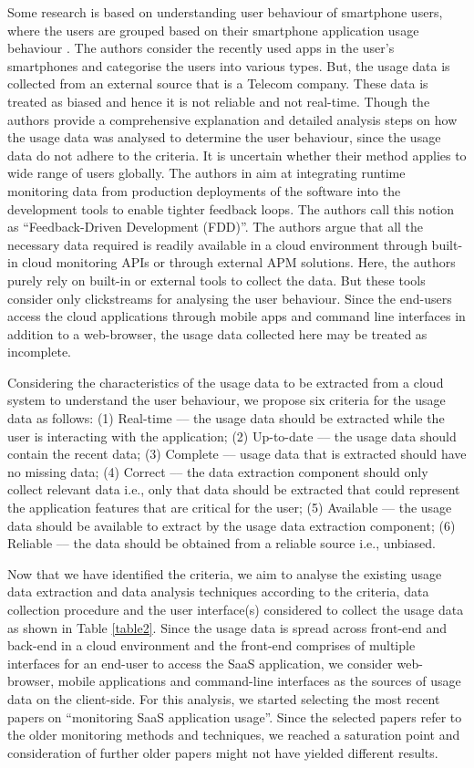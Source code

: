 \documentclass[a4paper,twoside]{article}
\begin{document}
Some research is based on understanding user behaviour of smartphone users, where the users are grouped based on their smartphone application usage behaviour \cite{Zhao2016DiscoveringBehaviors}. The authors consider the recently used apps in the user’s smartphones and categorise the users into various types. But, the usage data is collected from an external source that is a Telecom company. These data is treated as biased and hence it is not reliable and not real-time. Though the authors provide a comprehensive explanation and detailed analysis steps on how the usage data was analysed to determine the user behaviour, since the usage data do not adhere to the criteria. It is uncertain whether their method applies to wide range of users globally. The authors in \cite{Cito2015RuntimeFeedback} aim at integrating runtime monitoring data from production deployments of the software into the development tools to enable tighter feedback loops. The authors call this notion as “Feedback-Driven Development (FDD)”. The authors argue that all the necessary data required is readily available in a cloud environment through built-in cloud monitoring APIs or through external APM solutions. Here, the authors purely rely on built-in or external tools to collect the data. But these tools consider only clickstreams for analysing the user behaviour. Since the end-users access the cloud applications through mobile apps and command line interfaces in addition to a web-browser, the usage data collected here may be treated as incomplete.

Considering the characteristics of the usage data to be extracted from a cloud system to understand the user behaviour, we propose six criteria for the usage data as follows: (1) Real-time –-- the usage data should be extracted while the user is interacting with the application; (2) Up-to-date --– the usage data should contain the recent data; (3) Complete --– usage data that is extracted should have no missing data; (4) Correct –-- the data extraction component should only collect relevant data i.e., only that data should be extracted that could represent the application features that are critical for the user; (5) Available –-- the usage data should be available to extract by the usage data extraction component; (6) Reliable –-- the data should be obtained from a reliable source i.e., unbiased.

Now that we have identified the criteria, we aim to analyse the existing usage data extraction and data analysis techniques according to the criteria, data collection procedure and the user interface(s) considered to collect the usage data as shown in Table \ref{table2}. Since the usage data is spread across front-end and back-end in a cloud environment and the front-end comprises of multiple interfaces for an end-user to access the SaaS application, we consider web-browser, mobile applications and command-line interfaces as the sources of usage data on the client-side. For this analysis, we started selecting the most recent papers on “monitoring SaaS application usage”. Since the selected papers refer to the older monitoring methods and techniques, we reached a saturation point and consideration of further older papers might not have yielded different results. 
\end{document}

